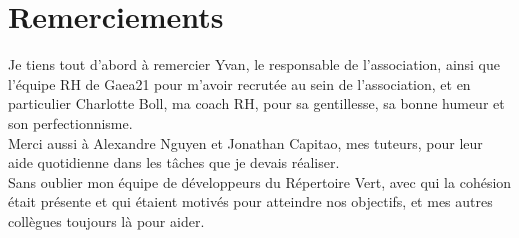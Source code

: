 \section*{Remerciements}
\thispagestyle{noTitledHeader}

\begin{flushleft}

Je tiens tout d'abord à remercier Yvan, le responsable de l'association, ainsi que l'équipe RH de Gaea21 pour m'avoir recrutée au sein de l'association, et en particulier Charlotte Boll, ma coach RH, pour sa gentillesse, sa bonne humeur et son perfectionnisme.\\
\bigbreak
Merci aussi à Alexandre Nguyen et Jonathan Capitao, mes tuteurs, pour leur aide quotidienne dans les tâches que je devais réaliser.\\
\bigbreak
Sans oublier mon équipe de développeurs du Répertoire Vert, avec qui la cohésion était présente et qui étaient motivés pour atteindre nos objectifs, et mes autres collègues toujours là pour aider.

\end{flushleft}